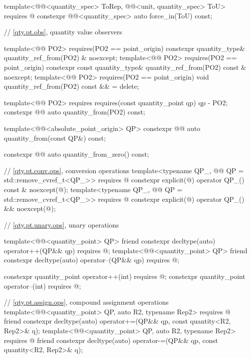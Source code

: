 \begin{codeblock}
{{  template<@@<quantity_spec> ToRep,
           @@<unit, quantity_spec> ToU>
    requires @\seebelownc@
  constexpr @@<quantity_spec> auto force_in(ToU) const;

  // \ref{qty.pt.obs}, quantity value observers

  template<@@ PO2>
    requires(PO2{} == point_origin)
  constexpr quantity_type& quantity_ref_from(PO2) & noexcept;
  template<@@ PO2>
    requires(PO2{} == point_origin)
  constexpr const quantity_type& quantity_ref_from(PO2) const & noexcept;
  template<@@ PO2>
    requires(PO2{} == point_origin)
  void quantity_ref_from(PO2) const && = delete;

  template<@@ PO2>
    requires requires(const quantity_point qp) { qp - PO2{}; }
  constexpr @@ auto quantity_from(PO2) const;

  template<@@<absolute_point_origin> QP>
  constexpr @@ auto quantity_from(const QP&) const;

  constexpr @@ auto quantity_from_zero() const;

  // \ref{qty.pt.conv.ops}, conversion operations
  template<typename QP_, @@ QP = std::remove_cvref_t<QP_>>
    requires @\seebelownc@
  constexpr explicit(@\seebelownc@) operator QP_() const & noexcept(@\seebelownc@);
  template<typename QP_, @@ QP = std::remove_cvref_t<QP_>>
    requires @\seebelownc@
  constexpr explicit(@\seebelownc@) operator QP_() && noexcept(@\seebelownc@);

  // \ref{qty.pt.unary.ops}, unary operations

  template<@@<quantity_point> QP>
  friend constexpr decltype(auto) operator++(QP&& qp)
    requires @\seebelownc@;
  template<@@<quantity_point> QP>
  friend constexpr decltype(auto) operator--(QP&& qp)
    requires @\seebelownc@;

  constexpr quantity_point operator++(int)
    requires @\seebelownc@;
  constexpr quantity_point operator--(int)
    requires @\seebelownc@;

  // \ref{qty.pt.assign.ops}, compound assignment operations
  template<@@<quantity_point> QP, auto R2, typename Rep2>
    requires @\seebelownc@
  friend constexpr decltype(auto) operator+=(QP&& qp, const quantity<R2, Rep2>& q);
  template<@@<quantity_point> QP, auto R2, typename Rep2>
    requires @\seebelownc@
  friend constexpr decltype(auto) operator-=(QP&& qp, const quantity<R2, Rep2>& q);

}}
\end{codeblock}
